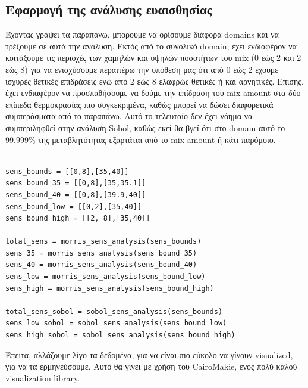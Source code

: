 \documentclass[11pt]{article}
\begin{document}
\subsection{Εφαρμογή της ανάλυσης ευαισθησίας}
\label{sec:org56b0b68}
Έχοντας γράψει τα παραπάνω, μπορούμε να ορίσουμε διάφορα domains και να τρέξουμε σε αυτά την ανάλυση. Εκτός από το συνολικό domain, έχει ενδιαφέρον να κοιτάξουμε τις περιοχές των χαμηλών και υψηλών ποσοτήτων του mix (0 εώς 2 και 2 εώς 8) για να ενισχύσουμε περαιτέρω την υπόθεση μας ότι από 0 εώς 2 έχουμε ισχυρές θετικές επιδράσεις ενώ από 2 εώς 8 ελαφρώς θετικές ή και αρνητικές. Επίσης, έχει ενδιαφέρον να προσπαθήσουμε να δούμε την επίδραση του mix amount στα δύο επίπεδα θερμοκρασίας πιο συγκεκριμένα, καθώς μπορεί να δώσει διαφορετικά συμπεράσματα από τα παραπάνω. Αυτό το τελευταίο δεν έχει νόημα να συμπεριληφθεί στην ανάλυση Sobol, καθώς εκεί θα βγεί ότι στο domain αυτό το 99.999\% της μεταβλητότητας εξαρτάται από το mix amount ή κάτι παρόμοιο.

\begin{verbatim}

sens_bounds = [[0,8],[35,40]]
sens_bound_35 = [[0,8],[35,35.1]]
sens_bound_40 = [[0,8],[39.9,40]]
sens_bound_low = [[0,2],[35,40]]
sens_bound_high = [[2, 8],[35,40]]

total_sens = morris_sens_analysis(sens_bounds)
sens_35 = morris_sens_analysis(sens_bound_35)
sens_40 = morris_sens_analysis(sens_bound_40)
sens_low = morris_sens_analysis(sens_bound_low)
sens_high = morris_sens_analysis(sens_bound_high)

total_sens_sobol = sobol_sens_analysis(sens_bounds)
sens_low_sobol = sobol_sens_analysis(sens_bound_low)
sens_high_sobol = sobol_sens_analysis(sens_bound_high)

\end{verbatim}

Έπειτα, αλλάζουμε λίγο τα δεδομένα, για να είναι πιο εύκολο να γίνουν visualized, για να τα ερμηνεύσουμε. Αυτό θα γίνει με χρήση του CairoMakie, ενός πολύ καλού visualization library.
\end{document}
